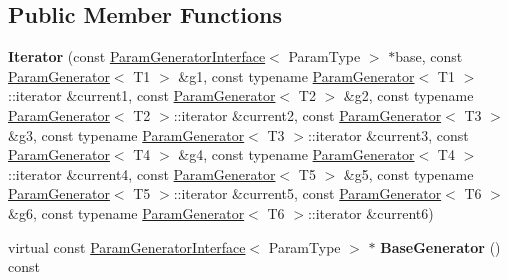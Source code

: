 \subsection*{Public Member Functions}
\begin{DoxyCompactItemize}
\item 
\mbox{\label{classtesting_1_1internal_1_1_cartesian_product_generator6_1_1_iterator_a46e3ffb6cdeadb3e42be6f40823209a7}} 
{\bfseries Iterator} (const \mbox{\hyperlink{classtesting_1_1internal_1_1_param_generator_interface}{Param\+Generator\+Interface}}$<$ Param\+Type $>$ $\ast$base, const \mbox{\hyperlink{classtesting_1_1internal_1_1_param_generator}{Param\+Generator}}$<$ T1 $>$ \&g1, const typename \mbox{\hyperlink{classtesting_1_1internal_1_1_param_generator}{Param\+Generator}}$<$ T1 $>$\+::iterator \&current1, const \mbox{\hyperlink{classtesting_1_1internal_1_1_param_generator}{Param\+Generator}}$<$ T2 $>$ \&g2, const typename \mbox{\hyperlink{classtesting_1_1internal_1_1_param_generator}{Param\+Generator}}$<$ T2 $>$\+::iterator \&current2, const \mbox{\hyperlink{classtesting_1_1internal_1_1_param_generator}{Param\+Generator}}$<$ T3 $>$ \&g3, const typename \mbox{\hyperlink{classtesting_1_1internal_1_1_param_generator}{Param\+Generator}}$<$ T3 $>$\+::iterator \&current3, const \mbox{\hyperlink{classtesting_1_1internal_1_1_param_generator}{Param\+Generator}}$<$ T4 $>$ \&g4, const typename \mbox{\hyperlink{classtesting_1_1internal_1_1_param_generator}{Param\+Generator}}$<$ T4 $>$\+::iterator \&current4, const \mbox{\hyperlink{classtesting_1_1internal_1_1_param_generator}{Param\+Generator}}$<$ T5 $>$ \&g5, const typename \mbox{\hyperlink{classtesting_1_1internal_1_1_param_generator}{Param\+Generator}}$<$ T5 $>$\+::iterator \&current5, const \mbox{\hyperlink{classtesting_1_1internal_1_1_param_generator}{Param\+Generator}}$<$ T6 $>$ \&g6, const typename \mbox{\hyperlink{classtesting_1_1internal_1_1_param_generator}{Param\+Generator}}$<$ T6 $>$\+::iterator \&current6)
\item 
\mbox{\label{classtesting_1_1internal_1_1_cartesian_product_generator6_1_1_iterator_a5e348b398cf72852f63d5982f9f65b03}} 
virtual const \mbox{\hyperlink{classtesting_1_1internal_1_1_param_generator_interface}{Param\+Generator\+Interface}}$<$ Param\+Type $>$ $\ast$ {\bfseries Base\+Generator} () const
\item 

\end{DoxyCompactItemize}

